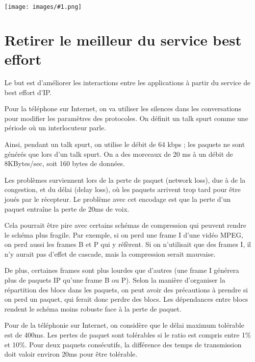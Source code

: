 \documentclass[10pt,a4paper]{report}
\newcommand{\dessinS}[2]{\begin{center}\texttt{[image: images/\#1.png]}\end{center}}
\begin{document}
			\dessinS{77}{.6}
			
	\section{Retirer le meilleur du service best effort}
		
	Le but est d'améliorer les interactions entre les applications à partir du service de best effort d'IP.
	
	Pour la téléphone sur Internet, on va utiliser les silences dans les conversations pour modifier les paramètres des protocoles. On définit un talk spurt comme une période où un interlocuteur parle.
	
	Ainsi, pendant un talk spurt, on utilise le débit de 64 kbps ; les paquets ne sont générés que lors d'un talk spurt. On a des morceaux de 20 ms à un débit de 8KBytes/sec, soit 160 bytes de données.
	
	Les problèmes surviennent lors de la perte de paquet (network loss), due à de la congestion, et du délai (delay loss), où les paquets arrivent trop tard pour être joués par le récepteur. Le problème avec cet encodage est que la perte d'un paquet entraîne la perte de 20ms de voix. 
	
	Cela pourrait être pire avec certains schémas de compression qui peuvent rendre le schéma plus fragile. Par exemple, si on perd une frame I d'une vidéo MPEG, on perd aussi les frames B et P qui y réfèrent. Si on n'utilisait que des frames I, il n'y aurait pas d'effet de cascade, mais la compression serait mauvaise. 
	
	De plus, certaines frames sont plus lourdes que d'autres (une frame I générera plus de paquets IP qu'une frame B ou P). Selon la manière d'organiser la répartition des blocs dans les paquets, on peut avoir des précautions à prendre si on perd un paquet, qui ferait donc perdre des blocs. Les dépendances entre blocs rendent le schéma moins robuste face à la perte de paquet.
	
	Pour de la téléphonie sur Internet, on considère que le délai maximum tolérable est de 400ms. Les pertes de paquet sont tolérables si le ratio est compris entre 1\% et 10\%. Pour deux paquets consécutifs, la différence des temps de transmission doit valoir environ 20ms pour être tolérable.
	
		
\end{document}
